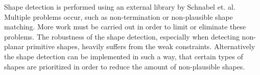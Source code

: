 Shape detection is performed using an external library by Schnabel et. al\cite{schnabel-2007-software}. Multiple problems occur, such as non-termination or non-plausible shape matching. More work must be carried out in order to limit or eliminate these problems. The robustness of the shape detection, especially when detecting non-planar primitive shapes, heavily suffers from the weak constraints. Alternatively the shape detection can be implemented in such a way, that certain types of shapes are prioritized in order to reduce the amount of non-plausible shapes. 
\\

